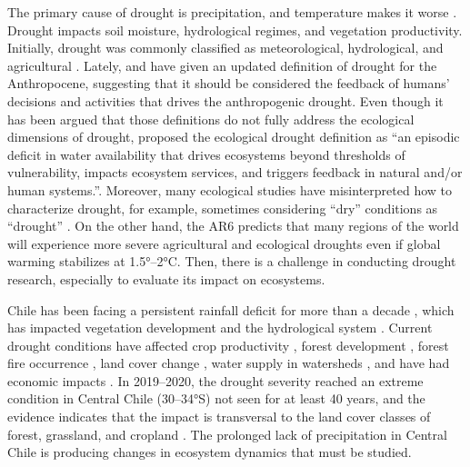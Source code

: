 \documentclass[
  number,
  preprint,
  3p,
  onecolumn]{elsarticle}
\begin{document}
The primary cause of drought is precipitation, and temperature makes it
worse \citep{Luo2017}. Drought impacts soil moisture, hydrological
regimes, and vegetation productivity. Initially, drought was commonly
classified as meteorological, hydrological, and agricultural
\citep{Wilhite1985}. Lately, \citep{Loon2016} and
\citep{AghaKouchak2021} have given an updated definition of drought for
the Anthropocene, suggesting that it should be considered the feedback
of humans' decisions and activities that drives the anthropogenic
drought. Even though it has been argued that those definitions do not
fully address the ecological dimensions of drought, \citep{Crausbay2017}
proposed the ecological drought definition as ``an episodic deficit in
water availability that drives ecosystems beyond thresholds of
vulnerability, impacts ecosystem services, and triggers feedback in
natural and/or human systems.''. Moreover, many ecological studies have
misinterpreted how to characterize drought, for example, sometimes
considering ``dry'' conditions as ``drought'' \citep{Slette2019}. On the
other hand, the AR6 \citep{IPCC2023} predicts that many regions of the
world will experience more severe agricultural and ecological droughts
even if global warming stabilizes at 1.5°--2°C. Then, there is a
challenge in conducting drought research, especially to evaluate its
impact on ecosystems.

Chile has been facing a persistent rainfall deficit for more than a
decade \citep{Garreaud2017}, which has impacted vegetation development
\citep{Zambrano2023} and the hydrological system \citep{Boisier2018}.
Current drought conditions have affected crop productivity
\citep{Zambrano2016, Zambrano2018}, forest development
\citep{Miranda2020, Venegas2018}, forest fire occurrence
\citep{UrrutiaJalabert2018}, land cover change \citep{Fuentes2021},
water supply in watersheds \citep{AlvarezGarreton2021}, and have had
economic impacts \citep{Fernandez2023}. In 2019--2020, the drought
severity reached an extreme condition in Central Chile (30--34°S) not
seen for at least 40 years, and the evidence indicates that the impact
is transversal to the land cover classes of forest, grassland, and
cropland \citep{Zambrano2023}. The prolonged lack of precipitation in
Central Chile is producing changes in ecosystem dynamics that must be
studied.
\end{document}
